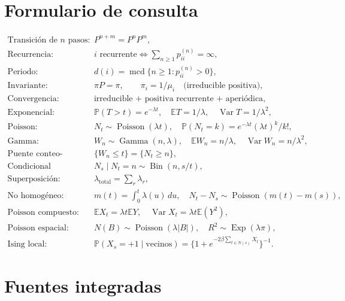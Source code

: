 \documentclass[11pt,oneside]{article}
\newcommand{\E}{\mathbb{E}}
\newcommand{\Prob}{\mathbb{P}}
\newcommand{\Var}{\operatorname{Var}}
\newcommand{\Pois}{\operatorname{Poisson}}
\newcommand{\Exp}{\operatorname{Exp}}
\newcommand{\GammaDist}{\operatorname{Gamma}}
\newcommand{\Bin}{\operatorname{Bin}}
\newcommand{\1}{\mathbf{1}}
\newcommand{\mcd}{\operatorname{mcd}}
\begin{document}
\section{Formulario de consulta}

\begin{align*}
\text{Transición de $n$ pasos:}\quad &P^{n+m}=P^nP^m,\\
\text{Recurrencia:}\quad &i\text{ recurrente}\iff \sum_{n\geq1}p_{ii}^{(n)}=\infty,\\
\text{Periodo:}\quad &d(i)=\mcd\{n\geq1:p_{ii}^{(n)}>0\},\\
\text{Invariante:}\quad &\pi P=\pi,\qquad \pi_i=1/\mu_i\quad\text{(irreducible positiva)},\\
\text{Convergencia:}\quad &\text{irreducible + positiva recurrente + aperiódica},\\[0.2em]
\text{Exponencial:}\quad &\Prob(T>t)=e^{-\lambda t},\quad \E T=1/\lambda,\quad \Var T=1/\lambda^2,\\
\text{Poisson:}\quad &N_t\sim\Pois(\lambda t),\quad \Prob(N_t=k)=e^{-\lambda t}(\lambda t)^k/k!,\\
\text{Gamma:}\quad &W_n\sim\GammaDist(n,\lambda),\quad \E W_n=n/\lambda,\quad \Var W_n=n/\lambda^2,\\
\text{Puente conteo-espera:}\quad &\{W_n\leq t\}=\{N_t\geq n\},\\
\text{Condicional temporal:}\quad &N_s\mid N_t=n\sim\Bin(n,s/t),\\
\text{Superposición:}\quad &\lambda_{\mathrm{total}}=\sum_r\lambda_r,\\
\text{No homogéneo:}\quad &m(t)=\int_0^t\lambda(u)\,du,\quad N_t-N_s\sim\Pois(m(t)-m(s)),\\
\text{Poisson compuesto:}\quad &\E X_t=\lambda t\E Y,\quad \Var X_t=\lambda t\E(Y^2),\\
\text{Poisson espacial:}\quad &N(B)\sim\Pois(\lambda|B|),\quad R^2\sim\Exp(\lambda\pi),\\
\text{Ising local:}\quad &\Prob(X_s=+1\mid\text{vecinos})=
 \{1+e^{-2\beta\sum_{t\in N(s)}X_t}\}^{-1}.
\end{align*}

\section{Fuentes integradas}
\end{document}
